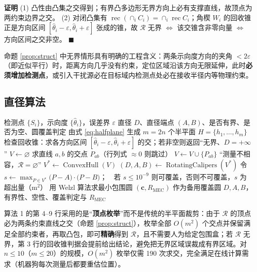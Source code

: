 \documentclass{cumcmthesis}
\newenvironment{pf}{\par\noindent\textbf{证明}\quad}{\hfill$\blacksquare$\par}
\begin{document}
\begin{pf}
(1) 凸性由凸集之交得到；有界凸多边形无界方向上必有支撑直线，故顶点为两约束边界之交。
(2) 对闭凸集有 $\operatorname{rec}(\cap_i C_i)=\cap_i\operatorname{rec}C_i$；角楔 $W_i$ 的回收锥正是方向区间 $[\hat\theta_i-\varepsilon,\hat\theta_i+\varepsilon]$ 张成的锥，故 $\mathcal{R}$ 无界 $\iff$ 该交锥含非零向量 $\iff$ 方向区间之交非空。
\end{pf}

命题 \ref{prop:struct} 中无界情形具有明确的工程含义：两条示向度方向的夹角 $<2\varepsilon$（即近似平行）时，距离方向几乎没有约束，定位区域沿该方向无限延伸，此时\textbf{必须增加检测点}，或引入干扰源必在目标域内检测点处必在接收半径内等物理约束。

\subsection{直径算法}

\begin{algorithm}[H]
\caption{交会定位区域直径算法（$\mathcal{R}$-Diameter）}
\begin{algorithmic}[1]
\Require 检测点 $\{S_i\}$，示向度 $\{\hat\theta_i\}$，误差界 $\varepsilon$
\Ensure 直径 $D$、直径端点 $(A,B)$、是否有界、是否为空、圆覆盖判定
\State 由式 \eqref{eq:halfplane} 生成 $m=2n$ 个半平面 $H=\{h_1,\dots,h_m\}$
\State 检查回收锥：求各方向区间 $[\hat\theta_i-\varepsilon,\hat\theta_i+\varepsilon]$ 的交；若非空则返回“无界、$D=+\infty$”
\State $V\gets\varnothing$
 
   \State 求直线 $a,b$ 的交点 $P_{ab}$（行列式 $\approx0$ 则跳过）
      \State $V\gets V\cup\{P_{ab}\}$
   \EndIf
\EndFor
{} \State \Return “测量不相容，$\mathcal{R}=\varnothing$”
\EndIf
\State $V^*\gets\operatorname{ConvexHull}(V)$ 
\State $(D,A,B)\gets\operatorname{RotatingCalipers}(V^*)$ 
\State 令 $s\gets\max_{P\in V^*}\bigl(P-A\bigr)\cdot\bigl(P-B\bigr)$；\ \ 若 $s\le10^{-9}$ 则可覆盖，否则不可覆盖，$s$ 为超出量（m$^2$）
\State 用 Welzl 算法求最小包围圆 $(\mathbf c,R_{\mathrm{MEC}})$ 作为备用覆盖圆
\State \Return $D,A,B$，有界性、空性、覆盖判定与 $R_{\mathrm{MEC}}$
\end{algorithmic}
\end{algorithm}

算法 1 的第 4--9 行采用的是“\textbf{顶点枚举}”而不是传统的半平面裁剪：由于 $\mathcal{R}$ 的顶点必为两条约束直线之交（命题 \ref{prop:struct}），枚举全部 $O(m^2)$ 个交点并保留满足全部约束者，再取凸包，即可\textbf{精确}得到 $\mathcal{R}$，且不需要人为给定包围盒；若 $\mathcal{R}$ 无界，第 3 行的回收锥判据会提前给出结论，避免把无界区域误裁成有界区域。对 $n\le10$（$m\le20$）的规模，$O(m^2)$ 枚举仅需 190 次求交，完全满足在线计算需求（机器狗每次测量后都要重估位置）。
\end{document}
